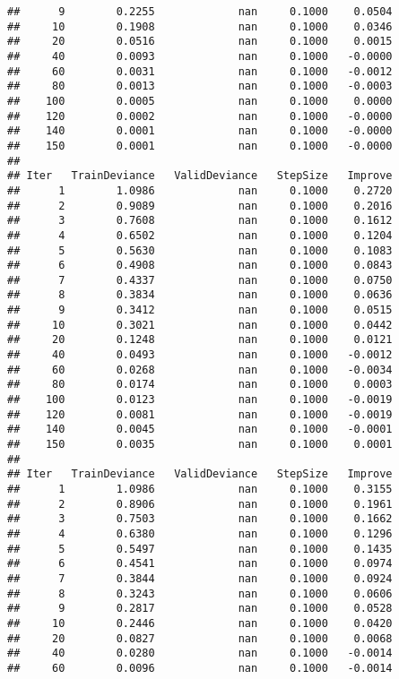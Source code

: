 \documentclass[
]{article}
\begin{document}
\begin{verbatim}
##      9        0.2255             nan     0.1000    0.0504
##     10        0.1908             nan     0.1000    0.0346
##     20        0.0516             nan     0.1000    0.0015
##     40        0.0093             nan     0.1000   -0.0000
##     60        0.0031             nan     0.1000   -0.0012
##     80        0.0013             nan     0.1000   -0.0003
##    100        0.0005             nan     0.1000    0.0000
##    120        0.0002             nan     0.1000   -0.0000
##    140        0.0001             nan     0.1000   -0.0000
##    150        0.0001             nan     0.1000   -0.0000
## 
## Iter   TrainDeviance   ValidDeviance   StepSize   Improve
##      1        1.0986             nan     0.1000    0.2720
##      2        0.9089             nan     0.1000    0.2016
##      3        0.7608             nan     0.1000    0.1612
##      4        0.6502             nan     0.1000    0.1204
##      5        0.5630             nan     0.1000    0.1083
##      6        0.4908             nan     0.1000    0.0843
##      7        0.4337             nan     0.1000    0.0750
##      8        0.3834             nan     0.1000    0.0636
##      9        0.3412             nan     0.1000    0.0515
##     10        0.3021             nan     0.1000    0.0442
##     20        0.1248             nan     0.1000    0.0121
##     40        0.0493             nan     0.1000   -0.0012
##     60        0.0268             nan     0.1000   -0.0034
##     80        0.0174             nan     0.1000    0.0003
##    100        0.0123             nan     0.1000   -0.0019
##    120        0.0081             nan     0.1000   -0.0019
##    140        0.0045             nan     0.1000   -0.0001
##    150        0.0035             nan     0.1000    0.0001
## 
## Iter   TrainDeviance   ValidDeviance   StepSize   Improve
##      1        1.0986             nan     0.1000    0.3155
##      2        0.8906             nan     0.1000    0.1961
##      3        0.7503             nan     0.1000    0.1662
##      4        0.6380             nan     0.1000    0.1296
##      5        0.5497             nan     0.1000    0.1435
##      6        0.4541             nan     0.1000    0.0974
##      7        0.3844             nan     0.1000    0.0924
##      8        0.3243             nan     0.1000    0.0606
##      9        0.2817             nan     0.1000    0.0528
##     10        0.2446             nan     0.1000    0.0420
##     20        0.0827             nan     0.1000    0.0068
##     40        0.0280             nan     0.1000   -0.0014
##     60        0.0096             nan     0.1000   -0.0014

\end{verbatim}
\end{document}
